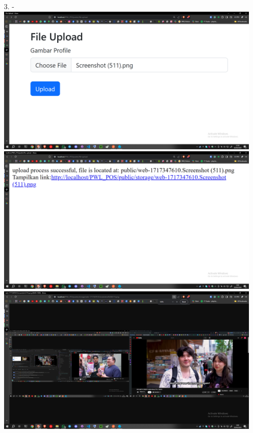 \documentclass[12pt,titlepage]{article}
\begin{document}
\begin{enumerate}
    \item[3.] - \\ \includegraphics[width=.9\textwidth]{images/figures/Screenshot (512).png} \\ \includegraphics[width=.9\textwidth]{images/figures/Screenshot (513).png} \\ \includegraphics[width=.9\textwidth]{images/figures/Screenshot (514).png}
\end{enumerate}
\end{document}
